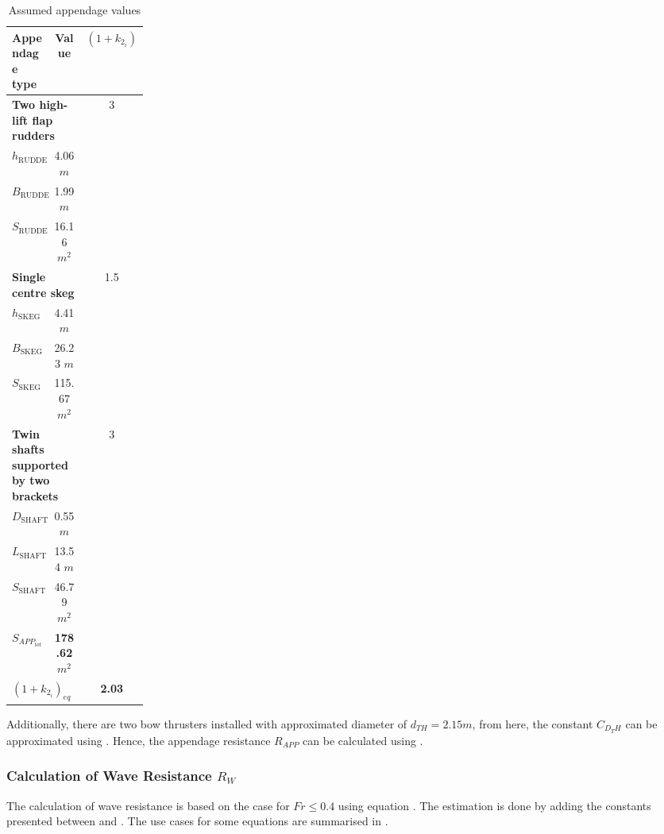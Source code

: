 \begin{table}[h]
    \footnotesize
    \centering
    {\begin{tabular}{ p{0.2\linewidth} c c}
    \hline
    Appendage type & Value & $(1+k_{2_i})$ \\
    \hline
    \multicolumn{2}{l}{\textbf{Two high-lift flap rudders}} & 3\\
    \hline
    $h_{\text{RUDDER}}$ & 4.06 $m$\\
    $B_{\text{RUDDER}}$ & 1.99 $m$\\
    $S_{\text{RUDDER}}$ & 16.16 $m^2$\\
    \hline
    \multicolumn{2}{l}{\textbf{Single centre skeg}} & 1.5\\
    \hline
    $h_{\text{SKEG}}$ & 4.41 $m$\\
    $B_{\text{SKEG}}$ & 26.23 $m$\\
    $S_{\text{SKEG}}$ & 115.67 $m^2$\\
    \hline
    \multicolumn{2}{l}{\textbf{Twin shafts supported by two brackets}} & 3\\
    \hline
    $D_{\text{SHAFT}}$ & 0.55 $m$\\
    $L_{\text{SHAFT}}$ & 13.54 $m$\\
    $S_{\text{SHAFT}}$ & 46.79 $m^2$\\
    \hline
    \multicolumn{1}{l}{\textbf{$S_{APP_{tot}}$}} & \textbf{178.62} $m^2$ \\
    \multicolumn{2}{l}{\textbf{$(1+k_{2_i})_{eq}$}} & \textbf{2.03} \\
    \end{tabular}}
\caption{Assumed appendage values}\label{tbl:assume_appendage_dimension}
\end{table}

Additionally, there are two bow thrusters installed with approximated diameter of $d_{TH}= 2.15 m$, from here, the constant $C_{D_TH}$ can be approximated using . Hence, the appendage resistance $R_{APP}$ can be calculated using .

\subsubsection*{Calculation of Wave Resistance $R_{W}$}

The calculation of wave resistance is based on the case for $Fr \leq 0.4$ using equation . The estimation is done by adding the constants presented between  and . The use cases for some equations are summarised in .

